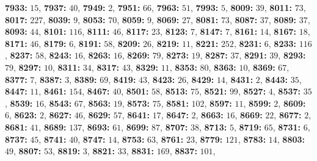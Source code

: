 \textsf{\bfseries 7933:} $15$, \textsf{\bfseries 7937:} $40$, \textsf{\bfseries 7949:} $2$, \textsf{\bfseries 7951:} $66$, \textsf{\bfseries 7963:} $51$, \textsf{\bfseries 7993:} $5$, \textsf{\bfseries 8009:} $39$, \textsf{\bfseries 8011:} $73$, \textsf{\bfseries 8017:} $227$, \textsf{\bfseries 8039:} $9$, \textsf{\bfseries 8053:} $70$, \textsf{\bfseries 8059:} $9$, \textsf{\bfseries 8069:} $27$, \textsf{\bfseries 8081:} $73$, \textsf{\bfseries 8087:} $37$, \textsf{\bfseries 8089:} $37$, \textsf{\bfseries 8093:} $44$, \textsf{\bfseries 8101:} $116$, \textsf{\bfseries 8111:} $46$, \textsf{\bfseries 8117:} $23$, \textsf{\bfseries 8123:} $7$, \textsf{\bfseries 8147:} $7$, \textsf{\bfseries 8161:} $14$, \textsf{\bfseries 8167:} $18$, \textsf{\bfseries 8171:} $46$, \textsf{\bfseries 8179:} $6$, \textsf{\bfseries 8191:} $58$, \textsf{\bfseries 8209:} $26$, \textsf{\bfseries 8219:} $11$, \textsf{\bfseries 8221:} $252$, \textsf{\bfseries 8231:} $6$, \textsf{\bfseries 8233:} $116$, \textsf{\bfseries 8237:} $58$, \textsf{\bfseries 8243:} $16$, \textsf{\bfseries 8263:} $16$, \textsf{\bfseries 8269:} $79$, \textsf{\bfseries 8273:} $19$, \textsf{\bfseries 8287:} $37$, \textsf{\bfseries 8291:} $39$, \textsf{\bfseries 8293:} $79$, \textsf{\bfseries 8297:} $10$, \textsf{\bfseries 8311:} $34$, \textsf{\bfseries 8317:} $43$, \textsf{\bfseries 8329:} $11$, \textsf{\bfseries 8353:} $80$, \textsf{\bfseries 8363:} $10$, \textsf{\bfseries 8369:} $67$, \textsf{\bfseries 8377:} $7$, \textsf{\bfseries 8387:} $3$, \textsf{\bfseries 8389:} $69$, \textsf{\bfseries 8419:} $43$, \textsf{\bfseries 8423:} $26$, \textsf{\bfseries 8429:} $14$, \textsf{\bfseries 8431:} $2$, \textsf{\bfseries 8443:} $35$, \textsf{\bfseries 8447:} $11$, \textsf{\bfseries 8461:} $154$, \textsf{\bfseries 8467:} $40$, \textsf{\bfseries 8501:} $58$, \textsf{\bfseries 8513:} $75$, \textsf{\bfseries 8521:} $99$, \textsf{\bfseries 8527:} $4$, \textsf{\bfseries 8537:} $35$, \textsf{\bfseries 8539:} $16$, \textsf{\bfseries 8543:} $67$, \textsf{\bfseries 8563:} $19$, \textsf{\bfseries 8573:} $75$, \textsf{\bfseries 8581:} $102$, \textsf{\bfseries 8597:} $11$, \textsf{\bfseries 8599:} $2$, \textsf{\bfseries 8609:} $6$, \textsf{\bfseries 8623:} $2$, \textsf{\bfseries 8627:} $46$, \textsf{\bfseries 8629:} $57$, \textsf{\bfseries 8641:} $17$, \textsf{\bfseries 8647:} $2$, \textsf{\bfseries 8663:} $16$, \textsf{\bfseries 8669:} $22$, \textsf{\bfseries 8677:} $2$, \textsf{\bfseries 8681:} $41$, \textsf{\bfseries 8689:} $137$, \textsf{\bfseries 8693:} $61$, \textsf{\bfseries 8699:} $87$, \textsf{\bfseries 8707:} $38$, \textsf{\bfseries 8713:} $5$, \textsf{\bfseries 8719:} $65$, \textsf{\bfseries 8731:} $6$, \textsf{\bfseries 8737:} $45$, \textsf{\bfseries 8741:} $40$, \textsf{\bfseries 8747:} $14$, \textsf{\bfseries 8753:} $63$, \textsf{\bfseries 8761:} $23$, \textsf{\bfseries 8779:} $121$, \textsf{\bfseries 8783:} $14$, \textsf{\bfseries 8803:} $49$, \textsf{\bfseries 8807:} $53$, \textsf{\bfseries 8819:} $3$, \textsf{\bfseries 8821:} $33$, \textsf{\bfseries 8831:} $169$, \textsf{\bfseries 8837:} $101$, 
